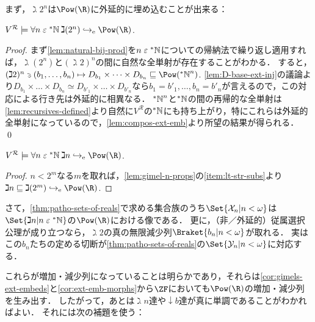 \documentclass[realisability.tex]{subfiles}
\begin{document}
まず，$\gimel 2^n$は$\Pow(\R)$に外延的に埋め込むことが出来る：
\begin{lemma}
 $V^{\mathcal{R}} \models \forall n \strin \NN \: \gimel(2^n) \eembto \Pow(\R)$.
\end{lemma}
\begin{proof}
 まず\cref{lem:natural-bij-prod}を$n \mathrel{\varepsilon} \mathord{{}^{*}\mathbb{N}}$についての帰納法で繰り返し適用すれば，$\gimel(2^n)$と$(\gimel 2)^n$の間に自然な全単射が存在することがわかる．
 すると，$(\gimel 2)^n \strni (b_1, \dots, b_n) \mapsto D_{b_1} \times \dots \times D_{b_n} \sqsubseteq \Pow(\NN^n)$.
 \cref{lem:D-base-ext-inj}の議論より$D_{b_1} \times \dots \times D_{b_n} \simeq D_{b'_1} \times \dots \times D_{b'_n}$なら$b_1 = b'_1, \dots, b_n = b'_n$が言えるので，この対応による行き先は外延的に相異なる．
 $\mathord{{}^{*}\mathbb{N}}^n$と$\mathord{{}^{*}\mathbb{N}}$の間の再帰的な全単射は\cref{lem:recursives-defined}より自然に$V^{\mathcal{R}}$の$\mathord{{}^{*}\mathbb{N}}$にも持ち上がり，特にこれらは外延的全単射になっているので，\cref{lem:compos-ext-emb}より所望の結果が得られる． \qed
\end{proof}

\begin{corollary}\label{cor:gimels-ext-embeds}
 $V^{\mathcal{R}} \models \forall n \strin \NN\: \gimel n \eembto \Pow(\R)$.
\end{corollary}
\begin{proof}
 $n < 2^m$なる$m$を取れば，\cref{lem:gimel-n-props}の\ref{item:lt-str-subs}より$\gimel n \sqsubseteq \gimel (2^m) \eembto \Pow(\R)$.
\end{proof}
さて，\cref{thm:patho-sets-of-reals}で求める集合族のうち$\Set{\mathcal{X}_n | n < \omega}$は$\Set{\gimel n | n \strin \NN}$の$\Pow(\R)$における像である．
更に，（非／外延的）従属選択公理が成り立つなら，$\gimel 2$の真の無限減少列$\Braket{b_n | n < \omega}$が取れる．
実はこの$b_n$たちの定める切断が\cref{thm:patho-sets-of-reals}の$\Set{\mathcal{Y}_n | n < \omega}$に対応する．

これらが増加・減少列になっていることは明らかであり，それらは\cref{cor:gimels-ext-embeds}と\cref{cor:ext-emb-morphs}から$\ZF$においても$\Pow(\R)$の増加・減少列を生み出す．
したがって，あとは$\gimel n$達や$\downarrow b$達が真に単調であることがわかればよい．
それには次の補題を使う：
\end{document}

